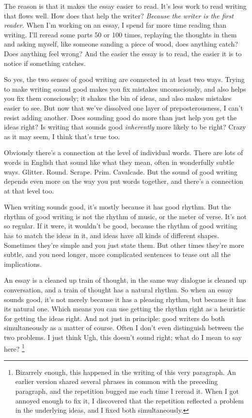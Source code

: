 \documentclass[12pt]{book}
\begin{document}
The reason is that it makes the essay easier to read. It's less work to
read writing that flows well. How does that help the writer?
\emph{Because the writer is the first reader.} When I'm working on an
essay, I spend far more time reading than writing. I'll reread some
parts 50 or 100 times, replaying the thoughts in them and asking myself,
like someone sanding a piece of wood, does anything catch? Does anything
feel wrong? And the easier the essay is to read, the easier it is to
notice if something catches.

So yes, the two senses of good writing are connected in at least two
ways. Trying to make writing sound good makes you fix mistakes
unconsciously, and also helps you fix them consciously; it shakes the
bin of ideas, and also makes mistakes easier to see. But now that we've
dissolved one layer of preposterousness, I can't resist adding another.
Does sounding good do more than just help you get the ideas right? Is
writing that sounds good \emph{inherently} more likely to be right?
Crazy as it may seem, I think that's true too.

Obviously there's a connection at the level of individual words. There
are lots of words in English that sound like what they mean, often in
wonderfully subtle ways. Glitter. Round. Scrape. Prim. Cavalcade. But
the sound of good writing depends even more on the way you put words
together, and there's a connection at that level too.

When writing sounds good, it's mostly because it has good rhythm. But
the rhythm of good writing is not the rhythm of music, or the meter of
verse. It's not so regular. If it were, it wouldn't be good, because the
rhythm of good writing has to match the ideas in it, and ideas have all
kinds of different shapes. Sometimes they're simple and you just state
them. But other times they're more subtle, and you need longer, more
complicated sentences to tease out all the implications.

An essay is a cleaned up train of thought, in the same way dialogue is
cleaned up conversation, and a train of thought has a natural rhythm. So
when an essay sounds good, it's not merely because it has a pleasing
rhythm, but because it has its natural one. Which means you can use
getting the rhythm right as a heuristic for getting the ideas right. And
not just in principle: good writers do both simultaneously as a matter
of course. Often I don't even distinguish between the two problems. I
just think Ugh, this doesn't sound right; what do I mean to say here?
\footnote{Bizarrely enough, this happened in the writing of this very
paragraph. An earlier version shared several phrases in common with the
preceding paragraph, and the repetition bugged me each time I reread it.
When I got annoyed enough to fix it, I discovered that the repetition
reflected a problem in the underlying ideas, and I fixed both
simultaneously.}
\end{document}

